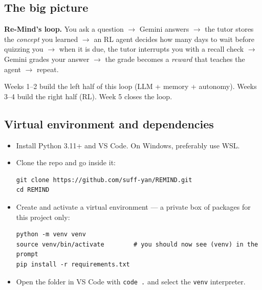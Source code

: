 \subsection{The big picture}
\begin{note}
\textbf{Re-Mind's loop.} You ask a question $\rightarrow$ Gemini answers $\rightarrow$ the tutor stores the
\emph{concept} you learned $\rightarrow$ an RL agent decides how many days to wait before quizzing you
$\rightarrow$ when it is due, the tutor interrupts you with a recall check $\rightarrow$ Gemini grades your answer
$\rightarrow$ the grade becomes a \emph{reward} that teaches the agent $\rightarrow$ repeat.
\end{note}
Weeks 1--2 build the left half of this loop (LLM + memory + autonomy). Weeks 3--4 build the right half (RL).
Week 5 closes the loop.



\subsection{Virtual environment and dependencies}
\begin{itemize}
  \item Install Python 3.11+ and VS Code. On Windows, preferably use WSL.
  \item Clone the repo and go inside it:
\begin{lstlisting}[style=shell]
git clone https://github.com/suff-yan/REMIND.git
cd REMIND
\end{lstlisting}
  \item Create and activate a virtual environment --- a private box of packages for this project only:
\begin{lstlisting}[style=shell]
python -m venv venv
source venv/bin/activate        # you should now see (venv) in the prompt
pip install -r requirements.txt
\end{lstlisting}
  \item Open the folder in VS Code with \texttt{code .} and select the \texttt{venv} interpreter.
\end{itemize}

